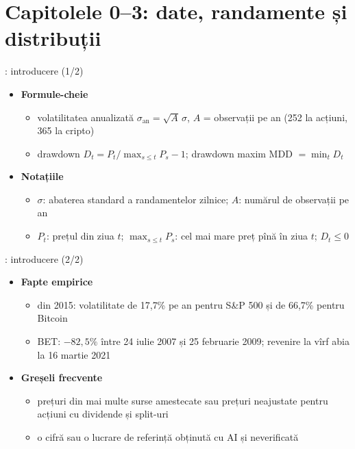 \section{Capitolele 0--3: date, randamente și distribuții}

\begin{frame}{: introducere (1/2)}
\itemsize{\small}
\begin{itemize}
    \item \textbf{Formule-cheie}
    \begin{itemize}
        \item volatilitatea anualizată $\sigma_{\text{an}} = \sqrt{A}\,\sigma$, $A$ = observații pe an (252 la acțiuni, 365 la cripto)
        \item drawdown $D_t = P_t/\max_{s \le t}P_s - 1$; drawdown maxim MDD $= \min_t D_t$
    \end{itemize}
    \item \textbf{Notațiile}
    \begin{itemize}
        \item $\sigma$: abaterea standard a randamentelor zilnice; $A$: numărul de observații pe an
        \item $P_t$: prețul din ziua $t$; $\max_{s \le t}P_s$: cel mai mare preț pînă în ziua $t$; $D_t \le 0$
    \end{itemize}
\end{itemize}
\end{frame}

\begin{frame}{: introducere (2/2)}
\itemsize{\small}
\begin{itemize}
    \item \textbf{Fapte empirice}
    \begin{itemize}
        \item din 2015: volatilitate de 17{,}7\% pe an pentru S\&P 500 și de 66{,}7\% pentru Bitcoin
        \item BET: $-82{,}5\%$ între 24 iulie 2007 și 25 februarie 2009; revenire la vîrf abia la 16 martie 2021
    \end{itemize}
    \item \textbf{Greșeli frecvente}
    \begin{itemize}
        \item prețuri din mai multe surse amestecate sau prețuri neajustate pentru acțiuni cu dividende și split-uri
        \item o cifră sau o lucrare de referință obținută cu AI și neverificată
    \end{itemize}
\end{itemize}
\end{frame}

